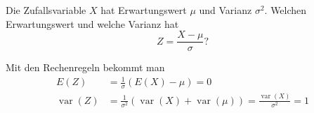 Die Zufallsvariable $X$ hat Erwartungswert $\mu$ und Varianz $\sigma^2$.
Welchen Erwartungswert und welche Varianz hat
\[
Z=\frac{X-\mu}{\sigma}?
\]

\begin{loesung}
Mit den Rechenregeln bekommt man
\begin{align*}
E(Z)&=
\frac1{\sigma}(E(X)-\mu)=0\\
\operatorname{var}(Z)&=
\frac1{\sigma^2}(\operatorname{var}(X)+\operatorname{var}(\mu))
=
\frac{\operatorname{var}(X)}{\sigma^2}=1
\end{align*}
\end{loesung}

